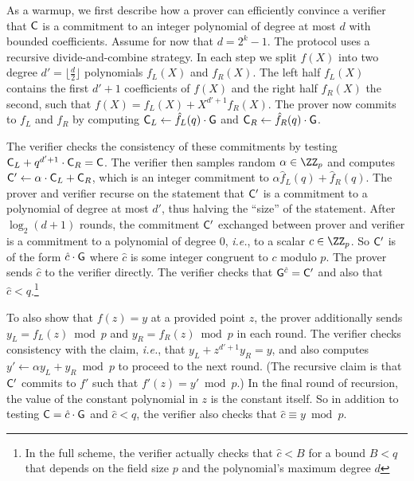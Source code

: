As a warmup, we first describe how a prover can efficiently convince a verifier that $\gr{C}$ is a commitment to an integer polynomial of degree at most $d$ with bounded coefficients. Assume for now that $d=2^k-1$. The protocol uses a recursive divide-and-combine strategy. 
In each step we split $f(X)$ into two degree $d'=\lfloor\frac{d}{2}\rfloor$ polynomials $f_L(X)$ and $f_R(X)$. 
The left half $f_L(X)$ contains the first $d'+1$ coefficients of $f(X)$ and the right half $f_R(X)$ the second, such that $f(X)=f_L(X)+X^{d'+1}f_R(X)$. The prover now commits to $f_L$ and $f_R$ by computing $\gr{C}_L\gets {\hat{f}_L(q)}\cdot \gr{g}$ and $\gr{C}_R\gets {\hat{f}_R(q)}\cdot \gr{g}$.
\begin{comment}
In our running example, $f_L(X)=4X+1$ and $f_R(X)=2X+3$. 
\end{comment} 
The verifier checks the consistency of these commitments by testing $\gr{C}_L+q^{d'+1}\cdot \gr{C}_R=\gr{C}$. The verifier then samples random  $\alpha \in \ZZ_p$ and computes $\gr{C}'\gets{\alpha}\cdot \gr{C}_L+\gr{C}_R$, which is an integer commitment to $\alpha \hat{f}_L(q) + \hat{f}_R(q)$. The prover and verifier recurse on the statement that $\gr{C}'$ is a commitment to a polynomial of degree at most $d'$, thus halving the ``size'' of the statement. %
After $\log_2(d+1)$ rounds, the commitment $\gr{C}'$ exchanged between prover and verifier is a commitment to a polynomial of degree $0$, \emph{i.e.}, to a scalar $c \in \ZZ_p$. So $\gr{C}'$ is of the form ${\hat{c}}\cdot \gr{g}$ where $\hat{c}$ is some integer congruent to $c$ modulo $p$. 
The prover sends $\hat{c}$ to the verifier directly. 
The verifier checks that $\gr{g}^{\hat{c}} = \gr{C}'$ and also that $\hat{c} < q$.\footnote{In the full scheme, the verifier actually checks that $\hat{c} < B$ for a bound $B < q$ that depends on the field size $p$ and the polynomial's maximum degree $d$} 

To also show that $f(z) = y$ at a provided point $z$, the prover additionally sends $y_L=f_L(z)\bmod p$ and $y_R=f_R(z)\bmod p$ in each round. The verifier checks consistency with the claim, \emph{i.e.}, that $y_L+z^{d'+1}y_R=y$, and also computes $y' \leftarrow \alpha y_L+y_R\bmod p$ to proceed to the next round. (The recursive claim is that $\gr{C}'$ commits to $f'$ such that $f'(z) = y' \bmod p$.) In the final round of recursion, the value of the constant polynomial in $z$ is the constant itself. So in addition to testing $\gr{C} = {\hat{c}}\cdot \gr{g}$ and $\hat{c} < q$, the verifier also checks that $\hat{c} \equiv y \bmod p$.

